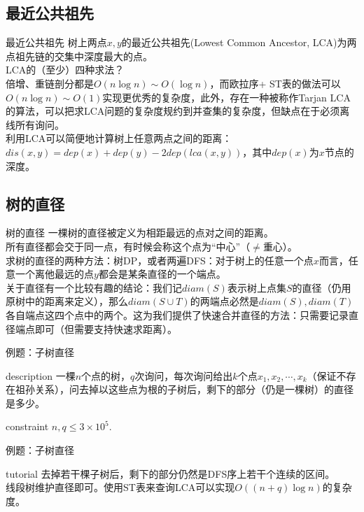 \documentclass{beamer}
\begin{document}
\subsection{最近公共祖先}
\begin{frame}{最近公共祖先}
	树上两点$x, y$的最近公共祖先(Lowest Common Ancestor, LCA)为两点祖先链的交集中深度最大的点。\\
	
	LCA的（至少）四种求法？\pause\\
	
	倍增、重链剖分都是$O(n\log n) \sim O(\log n)$，而欧拉序+ ST表的做法可以$O(n\log n) \sim O(1)$实现更优秀的复杂度，此外，存在一种被称作Tarjan LCA的算法，可以把求LCA问题的复杂度规约到并查集的复杂度，但缺点在于必须离线所有询问。\\
	
	利用LCA可以简便地计算树上任意两点之间的距离：$dis(x, y) = dep(x) + dep(y) - 2dep(lca(x, y))$，其中$dep(x)$为$x$节点的深度。
\end{frame}
\subsection{树的直径}
\begin{frame}{树的直径}
	一棵树的直径被定义为相距最远的点对之间的距离。\\
	
	所有直径都会交于同一点，有时候会称这个点为“中心”（$\neq$重心）。\\
	
	求树的直径的两种方法：树DP，或者两遍DFS：对于树上的任意一个点$x$而言，任意一个离他最远的点$y$都会是某条直径的一个端点。\\
	
	关于直径有一个比较有趣的结论：我们记$diam(S)$表示树上点集$S$的直径（仍用原树中的距离来定义），那么$diam(S\cup T)$的两端点必然是$diam(S), diam(T)$各自端点这四个点中的两个。这为我们提供了快速合并直径的方法：只需要记录直径端点即可（但需要支持快速求距离）。
\end{frame}

\begin{frame}{例题：子树直径}
	\begin{block}{description}
		一棵$n$个点的树，$q$次询问，每次询问给出$k$个点$x_1, x_2, \cdots, x_k$（保证不存在祖孙关系），问去掉以这些点为根的子树后，剩下的部分（仍是一棵树）的直径是多少。
	\end{block}
	\begin{block}{constraint}
		$n, q \le 3 \times 10^5.$
	\end{block}
\end{frame}
\begin{frame}{例题：子树直径}
	\begin{block}{tutorial}
		去掉若干棵子树后，剩下的部分仍然是DFS序上若干个连续的区间。\\
		
		线段树维护直径即可。使用ST表来查询LCA可以实现$O((n+q)\log n)$的复杂度。
	\end{block}
\end{frame}
\end{document}
